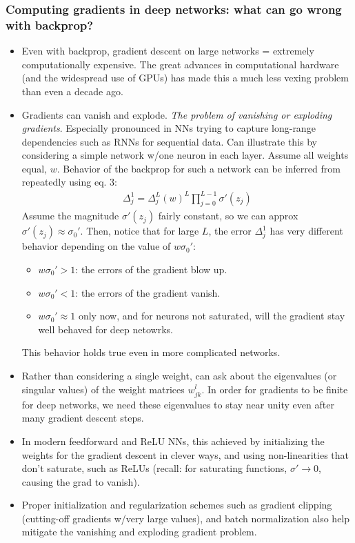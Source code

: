 \documentclass[norsk,a4paper,11pt]{article}
\begin{document}
\subsubsection{Computing gradients in deep networks: what can go wrong with backprop?}
\begin{itemize}
	\item Even with backprop, gradient descent on large networks = extremely computationally expensive. The great advances in computational hardware (and the widespread use of GPUs) has made this a much less vexing problem than even a decade ago.
	\item Gradients can vanish and explode. \textit{The problem of vanishing or exploding gradients}. Especially pronounced in NNs trying to capture long-range dependencies such as RNNs for sequential data. Can illustrate this by considering a simple network w/one neuron in each layer. Assume all weights equal, $w$. Behavior of the backprop for such a network can be inferred from repeatedly using eq. 3:
	\begin{align}
		\Delta_j^1 = \Delta_j^L (w)^L \prod_{j=0}^{L-1} \sigma' (z_j)
	\end{align} 
	Assume the magnitude $\sigma' (z_j)$ fairly constant, so we can approx $\sigma' (z_j) \approx \sigma_0 '$.
	Then, notice that for large $L$, the error $\Delta_j^1$ has very different behavior depending on the value of $w \sigma_0'$:
	\begin{itemize}
		\item $w \sigma_0' > 1$: the errors of the gradient blow up.
		\item $w \sigma_0' < 1$: the errors of the gradient vanish.
		\item $w \sigma_0' \approx 1$ only now, and for neurons not saturated, will the gradient stay well behaved for deep netowrks.
	\end{itemize}
	This behavior holds true even in more complicated networks.
	\item Rather than considering a single weight, can ask about the eigenvalues (or singular values) of the weight matrices $w_{jk}^l$. In order for gradients to be finite for deep networks, we need these eigenvalues to stay near unity even after many gradient descent steps.
	\item In modern feedforward and ReLU NNs, this achieved by initializing the weights for the gradient descent in clever ways, and using non-linearities that don't saturate, such as ReLUs (recall: for saturating functions, $\sigma' \rightarrow 0$, causing the grad to vanish). 
	\item Proper initialization and regularization schemes such as gradient clipping (cutting-off gradients w/very large values), and batch normalization also help mitigate the vanishing and exploding gradient problem.
\end{itemize}
\end{document}
